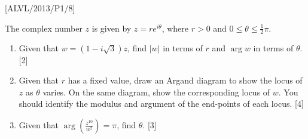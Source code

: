 \item {[}ALVL/2013/P1/8{]}

The complex number $z$ is given by $z=re^{i\theta}$, where $r>0$
and $0\leq\theta\leq\frac{1}{2}\pi$. 
\begin{enumerate}
\item Given that $w=\left(1-i\sqrt{3}\right)z$, find $\left|w\right|$
in terms of $r$ and $\arg w$ in terms of $\theta$. \hfill{} {[}2{]}
\item Given that $r$ has a fixed value, draw an Argand diagram to show
the locus of $z$ as $\theta$ varies. On the same diagram, show the
corresponding locus of $w$. You should identify the modulus and argument
of the end-points of each locus. \hfill{} {[}4{]}
\item Given that $\arg\left(\frac{z^{10}}{w^{2}}\right)=\pi$, find $\theta$.
\hfill{} {[}3{]}
\end{enumerate}
